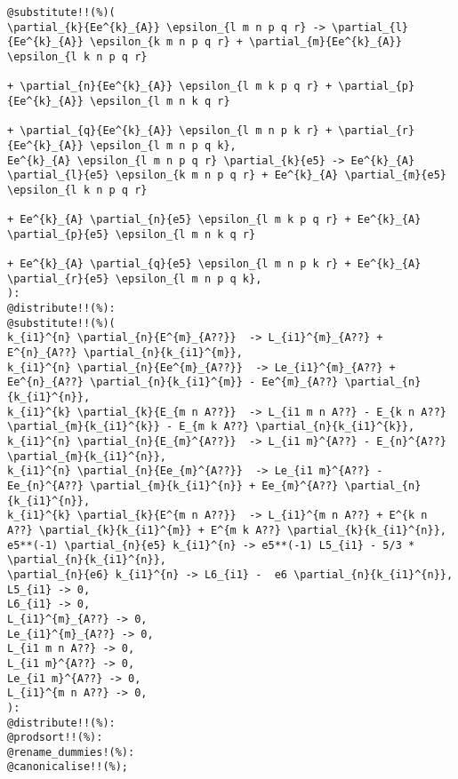 \documentclass[11pt]{article}
\begin{document}
{\color[named]{Blue}\begin{verbatim}
@substitute!!(%)(
\partial_{k}{Ee^{k}_{A}} \epsilon_{l m n p q r} -> \partial_{l}{Ee^{k}_{A}} \epsilon_{k m n p q r} + \partial_{m}{Ee^{k}_{A}} \epsilon_{l k n p q r}
                                                                                 + \partial_{n}{Ee^{k}_{A}} \epsilon_{l m k p q r} + \partial_{p}{Ee^{k}_{A}} \epsilon_{l m n k q r}
                                                                                 + \partial_{q}{Ee^{k}_{A}} \epsilon_{l m n p k r} + \partial_{r}{Ee^{k}_{A}} \epsilon_{l m n p q k},
Ee^{k}_{A} \epsilon_{l m n p q r} \partial_{k}{e5} -> Ee^{k}_{A} \partial_{l}{e5} \epsilon_{k m n p q r} + Ee^{k}_{A} \partial_{m}{e5} \epsilon_{l k n p q r}
                                                                                    + Ee^{k}_{A} \partial_{n}{e5} \epsilon_{l m k p q r} + Ee^{k}_{A} \partial_{p}{e5} \epsilon_{l m n k q r}
                                                                                    + Ee^{k}_{A} \partial_{q}{e5} \epsilon_{l m n p k r} + Ee^{k}_{A} \partial_{r}{e5} \epsilon_{l m n p q k},
):
@distribute!!(%):
@substitute!!(%)(
k_{i1}^{n} \partial_{n}{E^{m}_{A??}}  -> L_{i1}^{m}_{A??} + E^{n}_{A??} \partial_{n}{k_{i1}^{m}},
k_{i1}^{n} \partial_{n}{Ee^{m}_{A??}}  -> Le_{i1}^{m}_{A??} + Ee^{n}_{A??} \partial_{n}{k_{i1}^{m}} - Ee^{m}_{A??} \partial_{n}{k_{i1}^{n}},
k_{i1}^{k} \partial_{k}{E_{m n A??}}  -> L_{i1 m n A??} - E_{k n A??} \partial_{m}{k_{i1}^{k}} - E_{m k A??} \partial_{n}{k_{i1}^{k}},
k_{i1}^{n} \partial_{n}{E_{m}^{A??}}  -> L_{i1 m}^{A??} - E_{n}^{A??} \partial_{m}{k_{i1}^{n}},
k_{i1}^{n} \partial_{n}{Ee_{m}^{A??}}  -> Le_{i1 m}^{A??} - Ee_{n}^{A??} \partial_{m}{k_{i1}^{n}} + Ee_{m}^{A??} \partial_{n}{k_{i1}^{n}},
k_{i1}^{k} \partial_{k}{E^{m n A??}}  -> L_{i1}^{m n A??} + E^{k n A??} \partial_{k}{k_{i1}^{m}} + E^{m k A??} \partial_{k}{k_{i1}^{n}},
e5**(-1) \partial_{n}{e5} k_{i1}^{n} -> e5**(-1) L5_{i1} - 5/3 * \partial_{n}{k_{i1}^{n}},
\partial_{n}{e6} k_{i1}^{n} -> L6_{i1} -  e6 \partial_{n}{k_{i1}^{n}},
L5_{i1} -> 0,
L6_{i1} -> 0,
L_{i1}^{m}_{A??} -> 0,
Le_{i1}^{m}_{A??} -> 0,
L_{i1 m n A??} -> 0,
L_{i1 m}^{A??} -> 0,
Le_{i1 m}^{A??} -> 0,
L_{i1}^{m n A??} -> 0,
):
@distribute!!(%):
@prodsort!!(%):
@rename_dummies!(%):
@canonicalise!!(%);
\end{verbatim}}
\end{document}
